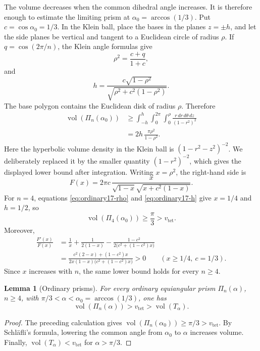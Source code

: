 \documentclass[12pt,a4paper]{article}
\newtheorem{lemma}[theorem]{Lemma}
\theoremstyle{definition}
\DeclareMathOperator{\Vol}{vol}
\newcommand{\vtet}{v_{\mathrm{tet}}}
\begin{document}
The volume decreases when the common dihedral angle increases. It is therefore
enough to estimate the limiting prism at
\(\alpha_0=\arccos(1/3)\). Put \(c=\cos\alpha_0=1/3\). In the Klein ball,
place the bases in the planes \(z=\pm h\), and let the side planes be vertical
and tangent to a Euclidean circle of radius \(\rho\). If
\(q=\cos(2\pi/n)\), the Klein angle formulas give
\begin{equation}\label{eq:ordinary17-rho}
        \rho^2=\frac{c+q}{1+c},
\end{equation}
and
\begin{equation}\label{eq:ordinary17-h}
        h=\frac{c\sqrt{1-\rho^2}}
        {\sqrt{\rho^2+c^2(1-\rho^2)}}.
\end{equation}
The base polygon contains the Euclidean disk of radius \(\rho\). Therefore
\begin{align}
        \Vol(\Pi_n(\alpha_0))
        &\ge
        \int_{-h}^{h}\int_0^{2\pi}\int_0^\rho
        \frac{r\,dr\,d\theta\,dz}{(1-r^2)^2}\nonumber\\
        &=2h\,\frac{\pi\rho^2}{1-\rho^2}.
        \label{eq:ordinary17-cylinder}
\end{align}
Here the hyperbolic volume density in the Klein ball is
\((1-r^2-z^2)^{-2}\).  We deliberately replaced it by the smaller quantity
\((1-r^2)^{-2}\), which gives the displayed lower bound after integration.
Writing \(x=\rho^2\), the right-hand side is
\[
        F(x)=2\pi c\,
        \frac{x}{\sqrt{1-x}\sqrt{x+c^2(1-x)}}.
\]
For \(n=4\), equations \eqref{eq:ordinary17-rho} and
\eqref{eq:ordinary17-h} give \(x=1/4\) and \(h=1/2\), so
\[
        \Vol(\Pi_4(\alpha_0))\ge\frac\pi3>\vtet.
\]
Moreover,
\begin{align*}
        \frac{F'(x)}{F(x)}
        &=\frac1x+\frac{1}{2(1-x)}
        -\frac{1-c^2}{2\bigl(c^2+(1-c^2)x\bigr)}
        \\
        &=\frac{c^2(2-x)+(1-c^2)x}
        {2x(1-x)\bigl(c^2+(1-c^2)x\bigr)}>0
        \qquad (x\ge1/4,\ c=1/3).
\end{align*}
Since \(x\) increases with \(n\), the same lower bound holds for every
\(n\ge4\).

\begin{lemma}[Ordinary prisms]\label{lem:ordinary-prisms-v17}
For every ordinary equiangular prism \(\Pi_n(\alpha)\), \(n\ge4\), with
\(\pi/3<\alpha<\alpha_0=\arccos(1/3)\), one has
\[
        \Vol(\Pi_n(\alpha))>\vtet>\Vol(T_\alpha).
\]
\end{lemma}

\begin{proof}
The preceding calculation gives
\(\Vol(\Pi_n(\alpha_0))\ge\pi/3>\vtet\). By Schl\"afli's formula,
lowering the common angle from \(\alpha_0\) to \(\alpha\) increases volume.
Finally, \(\Vol(T_\alpha)<\vtet\) for \(\alpha>\pi/3\).
\end{proof}
\end{document}
